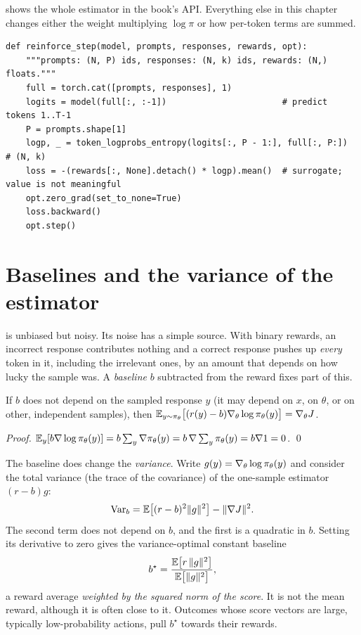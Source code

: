  shows the whole estimator in the book's API. Everything else in this
chapter changes either the weight multiplying $\log\pi$ or how per-token terms are summed.

\begin{lstlisting}[caption={The REINFORCE surrogate for a batch of fixed-length responses (from \code{llmsys.pg}).},label={lst:pg:surrogate}]
def reinforce_step(model, prompts, responses, rewards, opt):
    """prompts: (N, P) ids, responses: (N, k) ids, rewards: (N,) floats."""
    full = torch.cat([prompts, responses], 1)
    logits = model(full[:, :-1])                       # predict tokens 1..T-1
    P = prompts.shape[1]
    logp, _ = token_logprobs_entropy(logits[:, P - 1:], full[:, P:])   # (N, k)
    loss = -(rewards[:, None].detach() * logp).mean()  # surrogate; value is not meaningful
    opt.zero_grad(set_to_none=True)
    loss.backward()
    opt.step()
\end{lstlisting}

\section{Baselines and the variance of the estimator}\label{sec:pg:baselines}

 is unbiased but noisy. Its noise has a simple source. With binary
rewards, an incorrect response contributes nothing and a correct response pushes up
\emph{every} token in it, including the irrelevant ones, by an amount that depends on how
lucky the sample was. A \emph{baseline} $b$ subtracted from the reward fixes part of this.

\begin{proposition}\label{prop:pg:baseline}
If $b$ does not depend on the sampled response $y$ (it may depend on $x$, on $\theta$, or on
other, independent samples), then
$\mathbb{E}_{y\sim\pi_\theta}\big[(r(y)-b)\nabla_\theta\log\pi_\theta(y)\big]=\nabla_\theta J$.
\end{proposition}
\emph{Proof.} $\mathbb{E}_y[b\nabla\log\pi_\theta(y)]=b\sum_y\nabla\pi_\theta(y)=b\,\nabla\sum_y\pi_\theta(y)=b\nabla1=0$. \qed

The baseline does change the \emph{variance}. Write $g(y)=\nabla_\theta\log\pi_\theta(y)$ and
consider the total variance (the trace of the covariance) of the one-sample estimator
$(r-b)g$:
\begin{equation}
\operatorname{Var}_b=\mathbb{E}\big[(r-b)^2\|g\|^2\big]-\|\nabla J\|^2 .
\end{equation}
The second term does not depend on $b$, and the first is a quadratic in $b$. Setting its
derivative to zero gives the variance-optimal constant baseline
\begin{equation}
b^\star=\frac{\mathbb{E}\big[r\,\|g\|^2\big]}{\mathbb{E}\big[\|g\|^2\big]},
\label{eq:pg:bstar}
\end{equation}
a reward average \emph{weighted by the squared norm of the score}. It is not the mean reward,
although it is often close to it. Outcomes whose score vectors are large, typically
low-probability actions, pull $b^\star$ towards their rewards.

